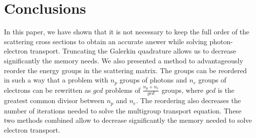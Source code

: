 \section{Conclusions}
In this paper, we have shown that it is not necessary to keep the full order of
the scattering cross sections to obtain an accurate answer while solving
photon-electron transport. Truncating the Galerkin quadrature allows us to
decrease significantly the memory needs. We also presented a method to
advantageously reorder the energy groups in the scattering matrix. The groups can 
be reordered in such a way that a problem with $n_p$ groups of photons and $n_e$ 
groups of electrons can be rewritten as $gcd$ problems of $\frac{n_p+n_e}{gcd}$ 
groups, where $gcd$ is the greatest common divisor between $n_p$ and $n_e$.
The reordering also decreases the number of iterations needed to solve the
multigroup transport equation.
These two methods combined allow to decrease significantly the memory needed to 
solve electron transport.
